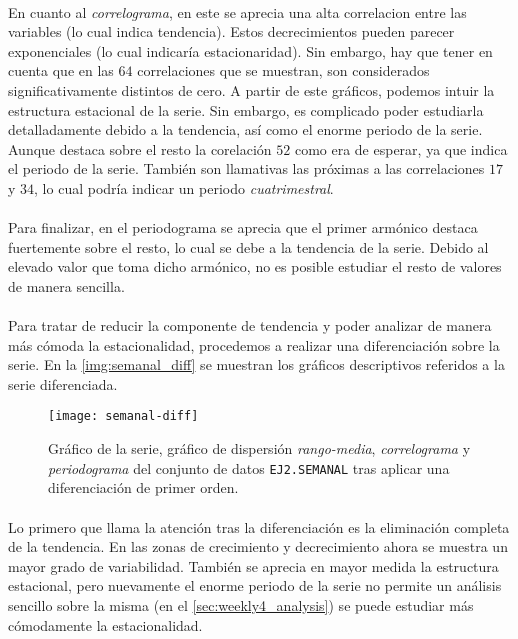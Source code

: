 \documentclass[a4paper, spanish]{article}
\begin{document}
      \paragraph{}
      En cuanto al \emph{correlograma}, en este se aprecia una alta correlacion entre las variables (lo cual indica tendencia). Estos decrecimientos pueden parecer exponenciales (lo cual indicaría estacionaridad). Sin embargo, hay que tener en cuenta que en las $64$ correlaciones que se muestran, son considerados significativamente distintos de cero. A partir de este gráficos, podemos intuir la estructura estacional de la serie. Sin embargo, es complicado poder estudiarla detalladamente debido a la tendencia, así como el enorme periodo de la serie. Aunque destaca sobre el resto la corelación $52$ como era de esperar, ya que indica el periodo de la serie. También son llamativas las próximas a las correlaciones $17$ y $34$, lo cual podría indicar un periodo \emph{cuatrimestral}.

      \paragraph{}
      Para finalizar, en el periodograma se aprecia que el primer armónico destaca fuertemente sobre el resto, lo cual se debe a la tendencia de la serie. Debido al elevado valor que toma dicho armónico, no es posible estudiar el resto de valores de manera sencilla.

      \paragraph{}
      Para tratar de reducir la componente de tendencia y poder analizar de manera más cómoda la estacionalidad, procedemos a realizar una diferenciación sobre la serie. En la \autoref{img:semanal_diff} se muestran los gráficos descriptivos referidos a la serie diferenciada.

      \begin{figure}[htb!]
        \centering
        \texttt{[image: semanal-diff]}
        \caption{Gráfico de la serie, gráfico de dispersión \emph{rango-media}, \emph{correlograma} y \emph{periodograma} del conjunto de datos \texttt{EJ2.SEMANAL} tras aplicar una diferenciación de primer orden.}
        \label{img:semanal_diff}
      \end{figure}

      \paragraph{}
      Lo primero que llama la atención tras la diferenciación es la eliminación completa de la tendencia. En las zonas de crecimiento y decrecimiento ahora se muestra un mayor grado de variabilidad. También se aprecia en mayor medida la estructura estacional, pero nuevamente el enorme periodo de la serie no permite un análisis sencillo sobre la misma (en el \autoref{sec:weekly4_analysis}) se puede estudiar más cómodamente la estacionalidad.
\end{document}
